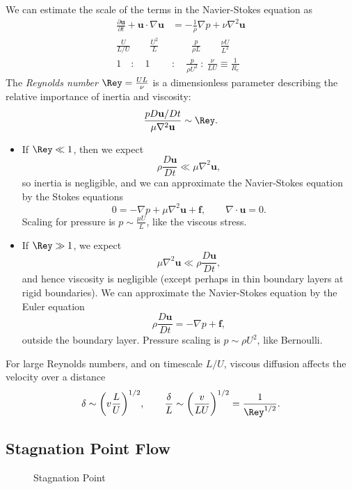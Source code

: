\documentclass[12pt]{article}
\begin{document}
We can estimate the scale of the terms in the Navier-Stokes equation as
\begin{align*}
	\frac{\partial \mathbf{u}}{\partial t} + \mathbf{u} \cdot \nabla \mathbf{u} &= - \frac{1}{\rho} \nabla p + \nu \nabla^2 \mathbf{u} \\
	\frac{U}{L/U}\qquad  \frac{U^2}{L} &\qquad \frac{p}{\rho L} \qquad  \frac{\nu U}{L^2} \\
	1\quad :\quad 1\quad  &: \quad \frac{p}{\rho U^2}\: : \: \frac{\nu}{LU} \equiv \frac{1}{R_e}
\end{align*}
The \emph{Reynolds number} $\Rey = \frac{UL}{\nu}$ is a dimensionless parameter describing the relative importance of inertia and viscosity:
\[
\frac{p D \mathbf{u}/Dt}{\mu \nabla^2 \mathbf{u}} \sim \Rey
.\]
\begin{itemize}
	\item If $\Rey \ll 1$, then we expect
		\[
		\rho \frac{D \mathbf{u}}{Dt} \ll \mu \nabla^2 \mathbf{u}
		,\]
		so inertia is negligible, and we can approximate the Navier-Stokes equation by the Stokes equations
		\[
		0 = - \nabla p + \mu \nabla^2 \mathbf{u} + \mathbf{f}, \qquad \nabla \cdot \mathbf{u} = 0.
		\]
		Scaling for pressure is $p \sim \frac{\mu U}{L}$, like the viscous stress.
	\item If $\Rey \gg 1$, we expect
		\[
		\mu \nabla^2 \mathbf{u} \ll \rho \frac{D \mathbf{u}}{Dt}
		,\]
		and hence viscosity is negligible (except perhaps in thin boundary layers at rigid boundaries). We can approximate the Navier-Stokes equation by the Euler equation
		\[
		\rho \frac{D \mathbf{u}}{Dt} = - \nabla p + \mathbf{f}
		,\]
		outside the boundary layer. Pressure scaling is $p \sim \rho U^2$, like Bernoulli.
\end{itemize}

For large Reynolds numbers, and on timescale $L/U$, viscous diffusion affects the velocity over a distance
\[
\delta \sim \biggl( v \frac{L}{U} \biggr)^{1/2}, \qquad \frac{\delta}{L} \sim \biggl( \frac{v}{LU}\biggr)^{1/2} = \frac{1}{\Rey^{1/2}}
.\]

\subsection{Stagnation Point Flow}
\label{sub:stagnation_point_flow}

\begin{figure}[h]
	\centering
	\caption{Stagnation Point}
	\label{fig:stagnation_point}
\end{figure}
\end{document}
